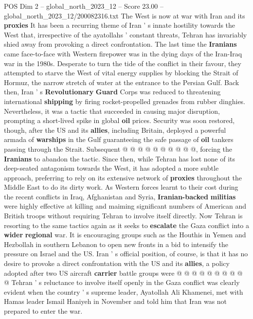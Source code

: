 \begin{textsample}{POS Dim 2 – global\_north\_2023\_12 – Score 23.00 – global\_north\_2023\_12/200082316.txt}  \label{ex:f2_pos_235}
The West is now at war with Iran and its \textbf{proxies} It has been a recurring theme of Iran ' s innate hostility towards the West that, irrespective of the ayatollahs ' constant threats, Tehran has invariably shied away from provoking a direct confrontation.
The last time the \textbf{Iranians} came face-to-face with Western firepower was in the dying days of the Iran-Iraq war in the 1980s.
Desperate to turn the tide of the conflict in their favour, they attempted to starve the West of vital energy supplies by blocking the Strait of Hormuz, the narrow stretch of water at the entrance to the Persian Gulf.
Back then, Iran ' s \textbf{Revolutionary} \textbf{Guard} Corps was reduced to threatening international \textbf{shipping} by firing rocket-propelled grenades from rubber dinghies.
Nevertheless, it was a tactic that succeeded in causing major disruption, prompting a short-lived spike in global \textbf{oil} prices.
Security was soon restored, though, after the US and its \textbf{allies}, including Britain, deployed a powerful armada of \textbf{warships} in the Gulf guaranteeing the safe passage of \textbf{oil} tankers passing through the Strait.
Subsequent @ @ @ @ @ @ @ @ @ @, forcing the \textbf{Iranians} to abandon the tactic.
Since then, while Tehran has lost none of its deep-seated antagonism towards the West, it has adopted a more subtle approach, preferring to rely on its extensive network of \textbf{proxies} throughout the Middle East to do its dirty work.
As Western forces learnt to their cost during the recent conflicts in Iraq, Afghanistan and Syria, \textbf{Iranian-backed} \textbf{militias} were highly effective at killing and maiming significant numbers of American and British troops without requiring Tehran to involve itself directly.
Now Tehran is resorting to the same tactics again as it seeks to \textbf{escalate} the Gaza conflict into a \textbf{wider} \textbf{regional} war.
It is encouraging groups such as the Houthis in Yemen and Hezbollah in southern Lebanon to open new fronts in a bid to intensify the pressure on Israel and the US.
Iran ' s official position, of course, is that it has no desire to provoke a direct confrontation with the US and its \textbf{allies}, a policy adopted after two US aircraft \textbf{carrier} battle groups were @ @ @ @ @ @ @ @ @ @ Tehran ' s reluctance to involve itself openly in the Gaza conflict was clearly evident when the country ' s supreme leader, Ayatollah Ali Khamenei, met with Hamas leader Ismail Haniyeh in November and told him that Iran was not prepared to enter the war.

\end{textsample}
